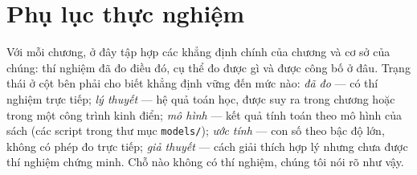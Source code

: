 \chapter{Phụ lục thực nghiệm}
\label{sec:supplement}

Với mỗi chương, ở đây tập hợp các khẳng định chính của chương và cơ sở của chúng: thí nghiệm đã đo điều đó, cụ thể đo được gì và được công bố ở đâu. Trạng thái ở cột bên phải cho biết khẳng định vững đến mức nào: \emph{đã đo} --- có thí nghiệm trực tiếp; \emph{lý thuyết} --- hệ quả toán học, được suy ra trong chương hoặc trong một công trình kinh điển; \emph{mô hình} --- kết quả tính toán theo mô hình của sách (các script trong thư mục \texttt{models/}); \emph{ước tính} --- con số theo bậc độ lớn, không có phép đo trực tiếp; \emph{giả thuyết} --- cách giải thích hợp lý nhưng chưa được thí nghiệm chứng minh. Chỗ nào không có thí nghiệm, chúng tôi nói rõ như vậy.























